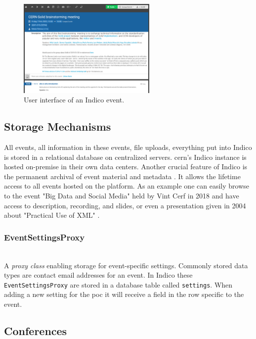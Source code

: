 \begin{figure}[H]
    \centering
    \includegraphics[width=0.6\textwidth]{thesis/latex/assets/indico-event-interface.png}
    \caption{User interface of an Indico event.}
    \label{fig:indico-event-interface}
\end{figure} 

\subsection{Storage Mechanisms}

All events, all information in these events, file uploads, everything put into Indico is stored in a relational database on centralized servers. \gls{cern}'s Indico instance is hosted on-premise in their own data centers. Another crucial feature of Indico is the permanent archival of event material and metadata \cite{cern-indico}. It allows the lifetime access to all events hosted on the platform. As an example one can easily browse to the event "Big Data and Social Media" held by Vint Cerf in 2018 \cite{vint-cerf} and have access to description, recording, and slides, or even a presentation given in 2004 about "Practical Use of XML" \cite{titov}.

\subsubsection{EventSettingsProxy}\mbox{}\\

A \textit{proxy class} enabling storage for event-specific settings. Commonly stored data types are contact email addresses for an event. In Indico these \texttt{EventSettingsProxy} are stored in a database table called \texttt{settings}. When adding a new setting for the \gls{poc} it will receive a field in the row specific to the event.

\subsection{Conferences}


